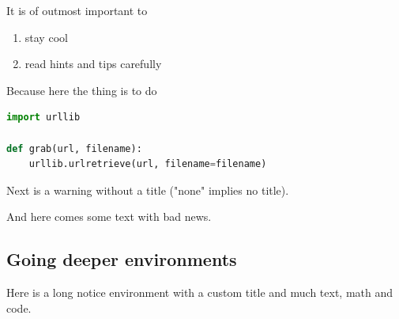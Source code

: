 \documentclass[%
oneside,                 %
final,                   %
10pt]{article}
\newenvironment{warningshaded}
{\def\FrameCommand{\fboxsep=3mm\colorbox{colors1_warning_background}}
 \MakeFramed {\advance\hsize-\width \FrameRestore}}{\endMakeFramed}
\newenvironment{warning_colors1admon}[1][Warning]{
\begin{warningshaded}
\noindent
\texttt{[image: latex\_figs/warning]}\ \ \   \textbf{#1}\\ \par
\vspace{-3mm}\nobreak\noindent\ignorespaces
}
{
\end{warningshaded}
}
\begin{document}
\begin{warning_colors1admon}[Tip]
It is of outmost important to

\begin{enumerate}
\item stay cool

\item read hints and tips carefully
\end{enumerate}

\noindent
Because here the thing is to do






\begin{lstlisting}[language=python,style=simple,xleftmargin=2mm]
import urllib

def grab(url, filename):
    urllib.urlretrieve(url, filename=filename)

\end{lstlisting}
\end{warning_colors1admon} %



Next is a warning without a title ("none" implies no title).


\begin{warning_colors1admon}[]
And here comes some text with bad news.
\end{warning_colors1admon} %



\subsection{Going deeper environments}

Here is a long notice environment with a custom title and much
text, math and code.
\end{document}
